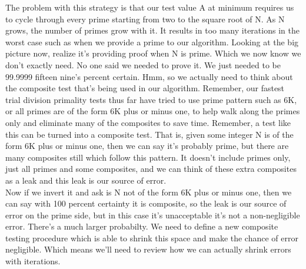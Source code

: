 \documentclass{report}
\begin{document}
The problem with this strategy is that our test value A at minimum requires us to cycle through every prime starting from two to the square root of N. As N grows, the number of primes grow with it. It results in too many iterations in the worst case such as when we provide a prime to our algorithm. Looking at the big picture now, realize it's providing proof when N is prime. Which we now know we don't exactly need. No one said we needed to prove it. We just needed to be 99.9999 fifteen nine's percent certain. Hmm, so we actually need to think about the composite test that's being used in our algorithm. Remember, our fastest trial division primality tests thus far have tried to use prime pattern such as 6K, or all primes are of the form 6K plus or minus one, to help walk along the primes only and eliminate many of the composites to save time. Remember, a test like this can be turned into a composite test. That is, given some integer N is of the form 6K plus or minus one, then we can say it's probably prime, but there are many composites still which follow this pattern. It doesn't include primes only, just all primes and some composites, and we can think of these extra composites as a leak and this leak is our source of error.\\
Now if we invert it and ask is N not of the form 6K plus or minus one, then we can say with 100 percent certainty it is composite, so the leak is our source of error on the prime side, but in this case it's unacceptable it's not a non-negligible error. There's a much larger probabilty. We need to define a new composite testing procedure which is able to shrink this space and make the chance of error negligible. Which means we'll need to review how we can actually shrink errors with iterations. 
\end{document}
